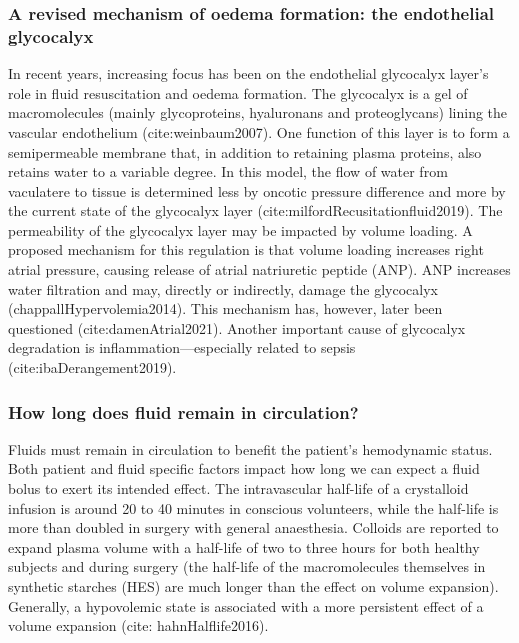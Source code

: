\documentclass[a4paper, nobind]{templates/ociamthesis}
\begin{document}
\hypertarget{a-revised-mechanism-of-oedema-formation-the-endothelial-glycocalyx}{%
\subsubsection{A revised mechanism of oedema formation: the endothelial glycocalyx}\label{a-revised-mechanism-of-oedema-formation-the-endothelial-glycocalyx}}

In recent years, increasing focus has been on the endothelial glycocalyx layer's role in fluid resuscitation and oedema formation. The glycocalyx is a gel of macromolecules (mainly glycoproteins, hyaluronans and proteoglycans) lining the vascular endothelium (cite:weinbaum2007). One function of this layer is to form a semipermeable membrane that, in addition to retaining plasma proteins, also retains water to a variable degree. In this model, the flow of water from vaculatere to tissue is determined less by oncotic pressure difference and more by the current state of the glycocalyx layer (cite:milfordRecusitationfluid2019). The permeability of the glycocalyx layer may be impacted by volume loading. A proposed mechanism for this regulation is that volume loading increases right atrial pressure, causing release of atrial natriuretic peptide (ANP). ANP increases water filtration and may, directly or indirectly, damage the glycocalyx (chappallHypervolemia2014). This mechanism has, however, later been questioned (cite:damenAtrial2021). Another important cause of glycocalyx degradation is inflammation---especially related to sepsis (cite:ibaDerangement2019).

\hypertarget{how-long-does-fluid-remain-in-circulation}{%
\subsubsection{How long does fluid remain in circulation?}\label{how-long-does-fluid-remain-in-circulation}}

Fluids must remain in circulation to benefit the patient's hemodynamic status. Both patient and fluid specific factors impact how long we can expect a fluid bolus to exert its intended effect. The intravascular half-life of a crystalloid infusion is around 20 to 40 minutes in conscious volunteers, while the half-life is more than doubled in surgery with general anaesthesia. Colloids are reported to expand plasma volume with a half-life of two to three hours for both healthy subjects and during surgery (the half-life of the macromolecules themselves in synthetic starches (HES) are much longer than the effect on volume expansion). Generally, a hypovolemic state is associated with a more persistent effect of a volume expansion (cite: hahnHalflife2016).
\end{document}
